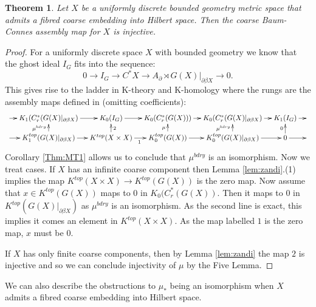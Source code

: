 \documentclass[preprint]{elsarticle}
\theoremstyle{plain}
\newtheorem{theorem}{Theorem}%
\theoremstyle{definition}%
\theoremstyle{remark}%
\begin{document}
\begin{theorem}\label{thm:mcor1}
Let $X$ be a uniformly discrete bounded geometry metric space that admits a fibred coarse embedding into Hilbert space. Then the coarse Baum-Connes assembly map for $X$ is injective.
\end{theorem}
\begin{proof}
For a uniformly discrete space $X$ with bounded geometry we know that the ghost ideal $I_{G}$ fits into the sequence:
\begin{equation*}
0 \rightarrow I_{G} \rightarrow C^{*}X \rightarrow A_{\partial}\rtimes G(X)|_{\partial\beta X} \rightarrow 0.
\end{equation*}
This gives rise to the ladder in K-theory and K-homology where the rungs are the assembly maps defined in \cite{mypub1} (omitting coefficients):
$$
\xymatrix@=1em{
\ar[r] & K_{1}(C^{*}_{r}(G(X)|_{\partial\beta X}) \ar[r] & K_{0}(I_{G}) \ar[r]& K_{0}(C^{*}_{r}(G(X))) \ar[r]& K_{0}(C^{*}_{r}(G(X)|_{\partial\beta X})\ar[r] & K_{1}(I_{G}) \ar[r] & \\
\ar[r] & K_{1}^{top}(G(X)|_{\partial\beta X}) \ar[r] \ar[u]^{\mu^{bdry}}& K^{top}(X \times X) \ar[r]_{1}\ar[u]_{2}& K_{0}^{top}(G(X)) \ar[r]\ar[u]^{\mu}& K_{0}^{top}(G(X)|_{\partial\beta X}) \ar[r]\ar[u]^{\mu^{bdry}}& 0\ar[u]^{0} \ar[r] &
}
$$
Corollary \ref{Thm:MT1} allows us to conclude that $\mu^{bdry}$ is an isomorphism. Now we treat cases. If $X$ has an infinite coarse component then Lemma \ref{lem:zandi}.(1) implies the map $K^{top}(X\times X) \rightarrow K^{top}(G(X))$ is the zero map. Now assume that $x \in K^{top}(G(X))$ maps to $0$ in $K_{0}(C^{*}_{r}(G(X))$. Then it maps to $0$ in $K^{top}(G(X)|_{\partial\beta X})$ as $\mu^{bdry}$ is an isomorphism. As the second line is exact, this implies it comes an element in $K^{top}(X\times X)$. As the map labelled $1$ is the zero map, $x$ must be $0$.

If $X$ has only finite coarse components, then by Lemma \ref{lem:zandi} the map $2$ is injective and so we can conclude injectivity of $\mu$ by the Five Lemma.
\end{proof}

We can also describe the obstructions to $\mu_{*}$ being an isomorphism when $X$ admits a fibred coarse embedding into Hilbert space.
\end{document}
